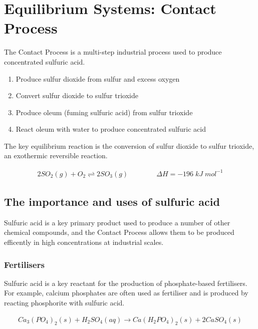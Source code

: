 \documentclass[12pt, a4paper]{article}
\begin{document}
\maketitle





\section{Equilibrium Systems: Contact Process}

The Contact Process is a multi-step industrial process used to produce concentrated sulfuric acid. 

\begin{enumerate}
	\item Produce sulfur dioxide from sulfur and excess oxygen
	\item Convert sulfur dioxide to sulfur trioxide
	\item Produce oleum (fuming sulfuric acid) from sulfur trioxide
	\item React oleum with water to produce concentrated sulfuric acid
\end{enumerate}

The key equilibrium reaction is the conversion of sulfur dioxide to sulfur trioxide, an exothermic reversible reaction.

\begin{align}
	2SO_{2}(g) + O_{2} \rightleftharpoons 2SO_{3}(g) \qquad \qquad \Delta H = -196 \; kJ \; mol^{-1}
\end{align}


\subsection{The importance and uses of sulfuric acid}

Sulfuric acid is a key primary product used to produce a number of other chemical compounds, and the Contact Process allows them to be produced efficently in high concentrations at industrial scales. 

\subsubsection{Fertilisers}
Sulfuric acid is a key reactant for the production of phosphate-based fertilisers. For example, calcium phosphates are often used as fertiliser and is produced by reacting phosphorite with sulfuric acid.

\begin{align}
	Ca_{3}(PO_{4})_{2}(s) + H_{2}SO_{4}(aq) \rightarrow Ca(H_{2}PO_{4})_{2}(s) + 2CaSO_{4}(s)
\end{align}
\end{document}
